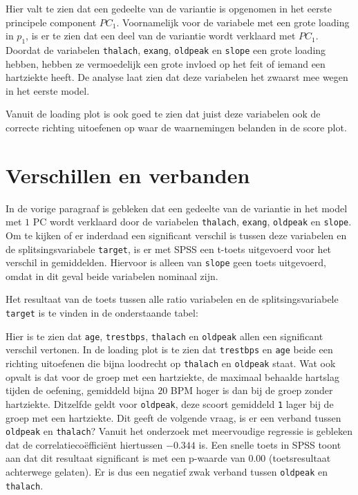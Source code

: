 \documentclass[11pt]{article}
\begin{document}
    Hier valt te zien dat een gedeelte van de variantie is opgenomen in het
eerste principele component \(PC_1\). Voornamelijk voor de variabele met
een grote loading in \(p_1\), is er te zien dat een deel van de
variantie wordt verklaard met \(PC_1\). Doordat de variabelen
\texttt{thalach}, \texttt{exang}, \texttt{oldpeak} en \texttt{slope} een
grote loading hebben, hebben ze vermoedelijk een grote invloed op het
feit of iemand een hartziekte heeft. De analyse laat zien dat deze
variabelen het zwaarst mee wegen in het eerste model.

Vanuit de loading plot is ook goed te zien dat juist deze variabelen ook
de correcte richting uitoefenen op waar de waarnemingen belanden in de
score plot.

    \hypertarget{verschillen-en-verbanden}{%
\section{Verschillen en verbanden}\label{verschillen-en-verbanden}}

    In de vorige paragraaf is gebleken dat een gedeelte van de variantie in
het model met \(1\) PC wordt verklaard door de variabelen
\texttt{thalach}, \texttt{exang}, \texttt{oldpeak} en \texttt{slope}. Om
te kijken of er inderdaad een significant verschil is tussen deze
variabelen en de splitsingsvariabele \texttt{target}, is er met SPSS een
t-toets uitgevoerd voor het verschil in gemiddelden. Hiervoor is alleen
van \texttt{slope} geen toets uitgevoerd, omdat in dit geval beide
variabelen nominaal zijn.

Het resultaat van de toets tussen alle ratio variabelen en de
splitsingsvariabele \texttt{target} is te vinden in de onderstaande
tabel:


 \begin{center}
\end{center}

    Hier is te zien dat \texttt{age}, \texttt{trestbps}, \texttt{thalach} en
\texttt{oldpeak} allen een significant verschil vertonen. In de loading
plot is te zien dat \texttt{trestbps} en \texttt{age} beide een richting
uitoefenen die bijna loodrecht op \texttt{thalach} en \texttt{oldpeak}
staat. Wat ook opvalt is dat voor de groep met een hartziekte, de
maximaal behaalde hartslag tijden de oefening, gemiddeld bijna \(20\)
BPM hoger is dan bij de groep zonder hartziekte. Ditzelfde geldt voor
\texttt{oldpeak}, deze scoort gemiddeld \texttt{1} lager bij de groep
met een hartziekte. Dit geeft de volgende vraag, is er een verband
tussen \texttt{oldpeak} en \texttt{thalach}? Vanuit het onderzoek met
meervoudige regressie is gebleken dat de correlatiecoëfficiënt
hiertussen \(-0.344\) is. Een snelle toets in SPSS toont aan dat dit
resultaat significant is met een p-waarde van \(0.00\) (toetsresultaat
achterwege gelaten). Er is dus een negatief zwak verband tussen
\texttt{oldpeak} en \texttt{thalach}.
\end{document}
